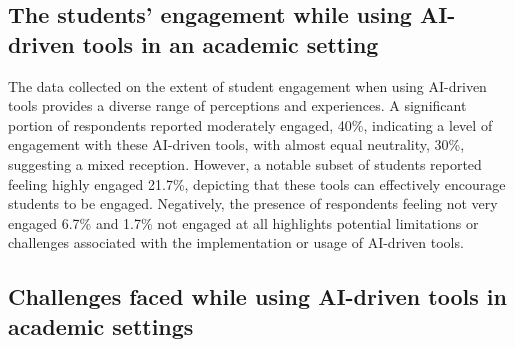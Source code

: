 \subsection{The students’ engagement while using AI-driven tools in an academic setting}

\begin{figure}[H]
	\centering
\end{figure}

The data collected on the extent of student engagement when using AI-driven
tools provides a diverse range of perceptions and experiences.
A significant portion of respondents reported moderately engaged, 40\%,
indicating a level of engagement with these AI-driven tools, with almost equal neutrality,
30\%, suggesting a mixed reception. However, a notable subset of students
reported feeling highly engaged 21.7\%, depicting that these tools can effectively
encourage students to be engaged.
Negatively, the presence of respondents feeling not very engaged 6.7\% and 1.7\% not
engaged at all highlights potential limitations or challenges associated with the
implementation or usage of AI-driven tools.

\subsection{Challenges faced while using AI-driven tools in academic settings}


